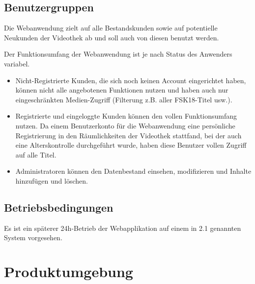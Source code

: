 \documentclass[12pt,oneside,a4paper,bibtotoc,liststotoc,pointlessnumbers]{scrartcl}
\begin{document}
\subsection{Benutzergruppen}
Die Webanwendung zielt auf alle Bestandskunden sowie auf potentielle Neukunden der Videothek ab und soll auch von diesen benutzt werden.\par
Der Funktionsumfang der Webanwendung ist je nach Status des Anwenders variabel.
\begin{itemize}
\item Nicht-Registrierte Kunden, die sich noch keinen Account eingerichtet haben, können nicht alle angebotenen Funktionen nutzen und haben auch nur eingeschränkten Medien-Zugriff (Filterung z.B. aller FSK18-Titel usw.).
\item Registrierte und eingeloggte Kunden können den vollen Funktionsumfang nutzen. Da einem Benutzerkonto für die Webanwendung eine persönliche Registrierung in den Räumlichkeiten der Videothek stattfand, bei der auch eine Alterskontrolle durchgeführt wurde, haben diese Benutzer vollen Zugriff auf alle Titel.
\item Administratoren können den Datenbestand einsehen, modifizieren und Inhalte hinzufügen und löschen.
\end{itemize}
\subsection{Betriebsbedingungen}
Es ist ein späterer 24h-Betrieb der Webapplikation auf einem in 2.1 genannten System vorgesehen.
\newpage
\section{Produktumgebung}
\end{document}
